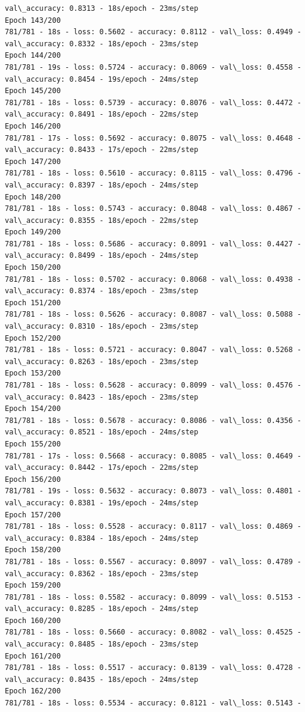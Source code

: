 \documentclass[11pt]{article}
\begin{document}
\begin{Verbatim}[commandchars=\\\{\}]
val\_accuracy: 0.8313 - 18s/epoch - 23ms/step
Epoch 143/200
781/781 - 18s - loss: 0.5602 - accuracy: 0.8112 - val\_loss: 0.4949 -
val\_accuracy: 0.8332 - 18s/epoch - 23ms/step
Epoch 144/200
781/781 - 19s - loss: 0.5724 - accuracy: 0.8069 - val\_loss: 0.4558 -
val\_accuracy: 0.8454 - 19s/epoch - 24ms/step
Epoch 145/200
781/781 - 18s - loss: 0.5739 - accuracy: 0.8076 - val\_loss: 0.4472 -
val\_accuracy: 0.8491 - 18s/epoch - 22ms/step
Epoch 146/200
781/781 - 17s - loss: 0.5692 - accuracy: 0.8075 - val\_loss: 0.4648 -
val\_accuracy: 0.8433 - 17s/epoch - 22ms/step
Epoch 147/200
781/781 - 18s - loss: 0.5610 - accuracy: 0.8115 - val\_loss: 0.4796 -
val\_accuracy: 0.8397 - 18s/epoch - 24ms/step
Epoch 148/200
781/781 - 18s - loss: 0.5743 - accuracy: 0.8048 - val\_loss: 0.4867 -
val\_accuracy: 0.8355 - 18s/epoch - 22ms/step
Epoch 149/200
781/781 - 18s - loss: 0.5686 - accuracy: 0.8091 - val\_loss: 0.4427 -
val\_accuracy: 0.8499 - 18s/epoch - 24ms/step
Epoch 150/200
781/781 - 18s - loss: 0.5702 - accuracy: 0.8068 - val\_loss: 0.4938 -
val\_accuracy: 0.8374 - 18s/epoch - 23ms/step
Epoch 151/200
781/781 - 18s - loss: 0.5626 - accuracy: 0.8087 - val\_loss: 0.5088 -
val\_accuracy: 0.8310 - 18s/epoch - 23ms/step
Epoch 152/200
781/781 - 18s - loss: 0.5721 - accuracy: 0.8047 - val\_loss: 0.5268 -
val\_accuracy: 0.8263 - 18s/epoch - 23ms/step
Epoch 153/200
781/781 - 18s - loss: 0.5628 - accuracy: 0.8099 - val\_loss: 0.4576 -
val\_accuracy: 0.8423 - 18s/epoch - 23ms/step
Epoch 154/200
781/781 - 18s - loss: 0.5678 - accuracy: 0.8086 - val\_loss: 0.4356 -
val\_accuracy: 0.8521 - 18s/epoch - 24ms/step
Epoch 155/200
781/781 - 17s - loss: 0.5668 - accuracy: 0.8085 - val\_loss: 0.4649 -
val\_accuracy: 0.8442 - 17s/epoch - 22ms/step
Epoch 156/200
781/781 - 19s - loss: 0.5632 - accuracy: 0.8073 - val\_loss: 0.4801 -
val\_accuracy: 0.8381 - 19s/epoch - 24ms/step
Epoch 157/200
781/781 - 18s - loss: 0.5528 - accuracy: 0.8117 - val\_loss: 0.4869 -
val\_accuracy: 0.8384 - 18s/epoch - 24ms/step
Epoch 158/200
781/781 - 18s - loss: 0.5567 - accuracy: 0.8097 - val\_loss: 0.4789 -
val\_accuracy: 0.8362 - 18s/epoch - 23ms/step
Epoch 159/200
781/781 - 18s - loss: 0.5582 - accuracy: 0.8099 - val\_loss: 0.5153 -
val\_accuracy: 0.8285 - 18s/epoch - 24ms/step
Epoch 160/200
781/781 - 18s - loss: 0.5660 - accuracy: 0.8082 - val\_loss: 0.4525 -
val\_accuracy: 0.8485 - 18s/epoch - 23ms/step
Epoch 161/200
781/781 - 18s - loss: 0.5517 - accuracy: 0.8139 - val\_loss: 0.4728 -
val\_accuracy: 0.8435 - 18s/epoch - 24ms/step
Epoch 162/200
781/781 - 18s - loss: 0.5534 - accuracy: 0.8121 - val\_loss: 0.5143 -

\end{Verbatim}
\end{document}
